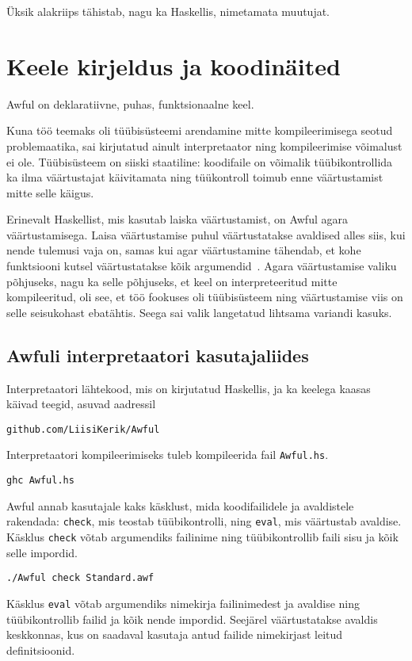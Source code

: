 \documentclass[12pt]{article}
\newcommand\peatykk[1]{
  \clearpage
  \section{#1}}
\begin{document}
      Üksik alakriips tähistab, nagu ka Haskellis, nimetamata muutujat.
  \peatykk{Keele kirjeldus ja koodinäited}\label{manual}
    Awful on deklaratiivne, puhas, funktsionaalne keel.

    Kuna töö teemaks oli tüübisüsteemi arendamine mitte kompileerimisega seotud problemaatika, sai kirjutatud ainult interpretaator ning kompileerimise võimalust ei ole. Tüübisüsteem on siiski staatiline: koodifaile on võimalik tüübikontrollida ka ilma väärtustajat käivitamata ning tüükontroll toimub enne väärtustamist mitte selle käigus.

    Erinevalt Haskellist, mis kasutab laiska väärtustamist, on Awful agara väärtustamisega. Laisa väärtustamise puhul väärtustatakse avaldised alles siis, kui nende tulemusi vaja on, samas kui agar väärtustamine tähendab, et kohe funktsiooni kutsel väärtustatakse kõik argumendid~\cite{Sem}. Agara väärtustamise valiku põhjuseks, nagu ka selle põhjuseks, et keel on interpreteeritud mitte kompileeritud, oli see, et töö fookuses oli tüübisüsteem ning väärtustamise viis on selle seisukohast ebatähtis. Seega sai valik langetatud lihtsama variandi kasuks.
    \subsection{Awfuli interpretaatori kasutajaliides}
      Interpretaatori lähtekood, mis on kirjutatud Haskellis, ja ka keelega kaasas käivad teegid, asuvad aadressil

      \begin{verbatim}github.com/LiisiKerik/Awful\end{verbatim}

      Interpretaatori kompileerimiseks tuleb kompileerida fail \verb!Awful.hs!.

      \begin{verbatim}ghc Awful.hs\end{verbatim}

      Awful annab kasutajale kaks käsklust, mida koodifailidele ja avaldistele rakendada: \verb!check!, mis teostab tüübikontrolli, ning \verb!eval!, mis väärtustab avaldise. Käsklus \verb!check! võtab argumendiks failinime ning tüübikontrollib faili sisu ja kõik selle impordid.

      \begin{verbatim}./Awful check Standard.awf\end{verbatim}

      Käsklus \verb!eval! võtab argumendiks nimekirja failinimedest ja avaldise ning tüübikontrollib failid ja kõik nende impordid. Seejärel väärtustatakse avaldis keskkonnas, kus on saadaval kasutaja antud failide nimekirjast leitud definitsioonid.
\end{document}
